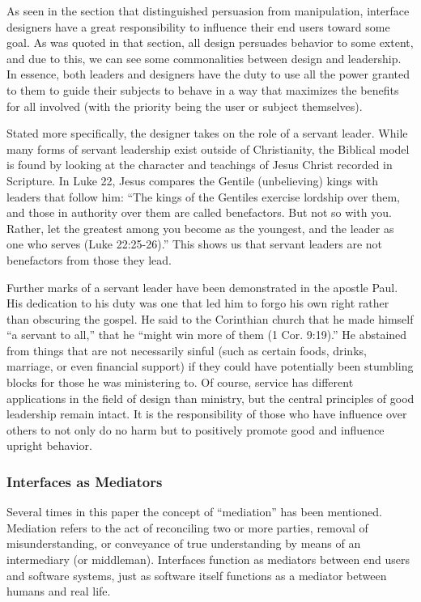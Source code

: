 \documentclass[12pt, oneside]{article}
\begin{document}
As seen in the section that distinguished persuasion from manipulation, interface designers have a great responsibility to influence their end users toward some goal. As was quoted in that section, all design persuades behavior to some extent, and due to this, we can see some commonalities between design and leadership. In essence, both leaders and designers have the duty to use all the power granted to them to guide their subjects to behave in a way that maximizes the benefits for all involved (with the priority being the user or subject themselves).

Stated more specifically, the designer takes on the role of a servant leader. While many forms of servant leadership exist outside of Christianity, the Biblical model is found by looking at the character and teachings of Jesus Christ recorded in Scripture. In Luke 22, Jesus compares the Gentile (unbelieving) kings with leaders that follow him: ``The kings of the Gentiles exercise lordship over them, and those in authority over them are called benefactors. But not so with you. Rather, let the greatest among you become as the youngest, and the leader as one who serves (Luke 22:25-26).'' This shows us that servant leaders are not benefactors from those they lead.

Further marks of a servant leader have been demonstrated in the apostle Paul. His dedication to his duty was one that led him to forgo his own right rather than obscuring the gospel. He said to the Corinthian church that he made himself ``a servant to all,'' that he ``might win more of them (1 Cor. 9:19).'' He abstained from things that are not necessarily sinful (such as certain foods, drinks, marriage, or even financial support) if they could have potentially been stumbling blocks for those he was ministering to. Of course, service has different applications in the field of design than ministry, but the central principles of good leadership remain intact. It is the responsibility of those who have influence over others to not only do no harm but to positively promote good and influence upright behavior.

\subsubsection{Interfaces as Mediators}

Several times in this paper the concept of ``mediation'' has been mentioned. Mediation refers to the act of reconciling two or more parties, removal of misunderstanding, or conveyance of true understanding by means of an intermediary (or middleman). Interfaces function as mediators between end users and software systems, just as software itself functions as a mediator between humans and real life.
\end{document}
